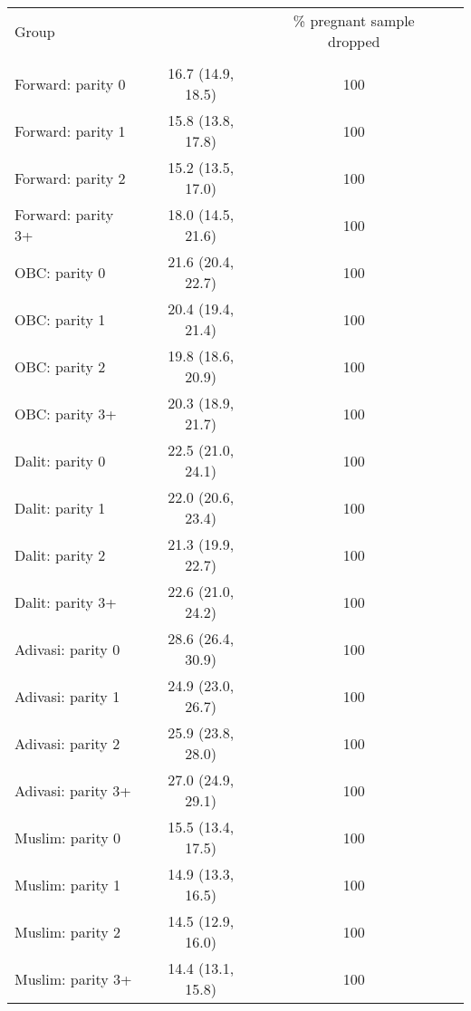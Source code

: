 \begin{tabular}{lccc}
\toprule
Group &  & \% pregnant sample dropped \\\\
\midrule
Forward: parity 0&16.7 (14.9, 18.5)&100\\
Forward: parity 1&15.8 (13.8, 17.8)&100\\
Forward: parity 2&15.2 (13.5, 17.0)&100\\
Forward: parity 3+&18.0 (14.5, 21.6)&100\\
OBC: parity 0&21.6 (20.4, 22.7)&100\\
OBC: parity 1&20.4 (19.4, 21.4)&100\\
OBC: parity 2&19.8 (18.6, 20.9)&100\\
OBC: parity 3+&20.3 (18.9, 21.7)&100\\
Dalit: parity 0&22.5 (21.0, 24.1)&100\\
Dalit: parity 1&22.0 (20.6, 23.4)&100\\
Dalit: parity 2&21.3 (19.9, 22.7)&100\\
Dalit: parity 3+&22.6 (21.0, 24.2)&100\\
Adivasi: parity 0&28.6 (26.4, 30.9)&100\\
Adivasi: parity 1&24.9 (23.0, 26.7)&100\\
Adivasi: parity 2&25.9 (23.8, 28.0)&100\\
Adivasi: parity 3+&27.0 (24.9, 29.1)&100\\
Muslim: parity 0&15.5 (13.4, 17.5)&100\\
Muslim: parity 1&14.9 (13.3, 16.5)&100\\
Muslim: parity 2&14.5 (12.9, 16.0)&100\\
Muslim: parity 3+&14.4 (13.1, 15.8)&100\\
\bottomrule
\end{tabular}
